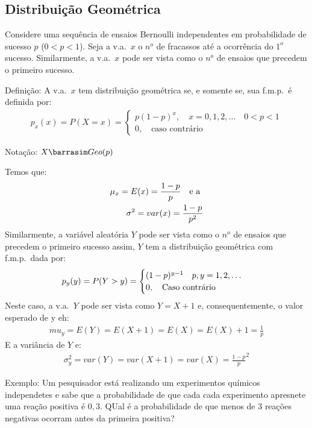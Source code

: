 \documentclass[11pt,a4paper]{book}
\begin{document}
      \subsection{Distribuição Geométrica}
      \begin{description}
        \item  Considere uma sequência de ensaios Bernoulli independentes em probabilidade de 
      sucesso $p$ ($0<p<1$). Seja a v.a.\ $x$ o $n^o$ de fracassos até a ocorrência 
      do $1^o$ sucesso. Similarmente, a v.a.\ $x$ pode ser vista como o $n^o$ de ensaios que precedem 
      o primeiro sucesso.

    \item{Definição}: A v.a.\ $x$ tem distribuição geométrica se, e somente se, sua 
      f.m.p.\ é definida por: 
      \begin{align}
        p_{x}(x)=P(X=x)=\begin{cases}
          p(1-p)^x, \quad x=0,1,2,\dots \quad 0<p<1\\
          0, \quad \text{caso contrário}
        \end{cases}
      \end{align}
      \begin{center}Notação: $X \barrasim Geo(p)$\end{center}
      Temos que:
      \begin{align}
        \mu_{x}=E(x)=\frac{1-p}{p} \text{\quad e a }\\
        \sigma^2 = var(x)=\frac{1-p}{p^2}
      \end{align}
      Similarmente, a variável aleatória $Y$ pode ser vista como o $n^o$ de ensaios que
      precedem o primeiro sucesso assim, $Y$ tem a distribuição geométrica com f.m.p.\ dada por:
        \begin{align}
        p_y(y)=P(Y>y)=\begin{cases}
          (1-p)^{y-1} \text{\quad }p,y=1,2,\dots \\
          0, \text{\quad Caso contrário}
        \end{cases}
      \end{align}
      Neste caso, a v.a.\ $Y$ pode ser vista como $Y=X+1$ e, consequentemente, o valor esperado de y eh:
      \begin{align} 
      mu_y=E(Y)=E(X+1)=E(X)=E(X)+1= \frac{1}{p}
    \end{align}
    E a variância de $Y$ e:
    \begin{align}
      \sigma_y^2=var(Y)=var(X+1)=var(X)= \frac{1-p}{p}^2
    \end{align}
  \item{Exemplo}: Um pesquisador está realizando um experimentos químicos independetes 
      e sabe que a probabilidade de que cada cada experimento apresnete uma reação 
      positiva é $0,3$. QUal é a probabilidade de que menos de 3 reações negativas 
      ocorram antes da primeira positiva?


\end{description}
\end{document}

